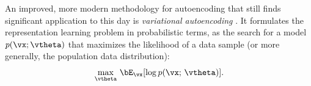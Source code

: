 \documentclass[../../book-main.tex]{subfiles}
\begin{document}
An improved, more modern methodology for autoencoding that still finds
significant application to this day is \textit{variational autoencoding}
\cite{Kingma2013-sb,Kingma2019-zh}.
%
It formulates the representation learning problem in probabilistic terms, as the
search for a model $p(\vx; \vtheta)$
that maximizes the likelihood of a data sample (or more generally, the
population data distribution):
\begin{equation*}\label{eq:VAE-MLE}
\max_{\vtheta}\, \bE_{\vx}[ \log p(\vx;\, \vtheta) ].
\end{equation*}
\end{document}
